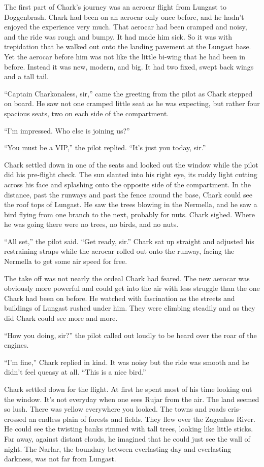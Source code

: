 The first part of Chark's journey was an aerocar flight from Lungast to Doggenbrash. Chark had
been on an aerocar only once before, and he hadn't enjoyed the experience very much. That
aerocar had been cramped and noisy, and the ride was rough and bumpy. It had made him sick. So
it was with trepidation that he walked out onto the landing pavement at the Lungast base. Yet
the aerocar before him was not like the little bi-wing that he had been in before. Instead it
was new, modern, and big. It had two fixed, swept back wings and a tall tail.

``Captain Charkonaless, sir,'' came the greeting from the pilot as Chark stepped on board. He
saw not one cramped little seat as he was expecting, but rather four spacious seats, two on each
side of the compartment.

``I'm impressed. Who else is joining us?''

``You must be a VIP,'' the pilot replied. ``It's just you today, sir.''

Chark settled down in one of the seats and looked out the window while the pilot did his
pre-flight check. The sun slanted into his right eye, its ruddy light cutting across his face
and splashing onto the opposite side of the compartment. In the distance, past the runways and
past the fence around the base, Chark could see the roof tops of Lungast. He saw the trees
blowing in the Nermella, and he saw a bird flying from one branch to the next, probably for
nuts. Chark sighed. Where he was going there were no trees, no birds, and no nuts.

``All set,'' the pilot said. ``Get ready, sir.'' Chark sat up straight and adjusted his
restraining straps while the aerocar rolled out onto the runway, facing the Nermella to get some
air speed for free.

The take off was not nearly the ordeal Chark had feared. The new aerocar was obviously more
powerful and could get into the air with less struggle than the one Chark had been on before. He
watched with fascination as the streets and buildings of Lungast rushed under him. They were
climbing steadily and as they did Chark could see more and more.

``How you doing, sir?'' the pilot called out loudly to be heard over the roar of the engines.

``I'm fine,'' Chark replied in kind. It was noisy but the ride was smooth and he didn't feel
queasy at all. ``This is a nice bird.''

Chark settled down for the flight. At first he spent most of his time looking out the window.
It's not everyday when one sees Rujar from the air. The land seemed so lush. There was yellow
everywhere you looked. The towns and roads cris-crossed an endless plain of forests and fields.
They flew over the Zagenhos River. He could see the twisting banks rimmed with tall trees,
looking like little sticks. Far away, against distant clouds, he imagined that he could just see
the wall of night. The Narlar, the boundary between everlasting day and everlasting darkness,
was not far from Lungast.

